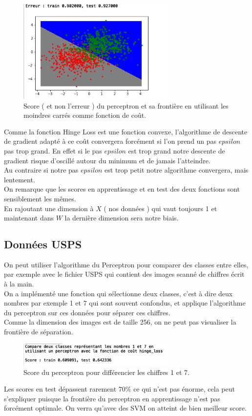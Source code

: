 \documentclass{article}
\begin{document}
\begin{figure}[h]
	\center
	\includegraphics[width=8cm]{figure/tme4_5/borderMse.png} 
	 \caption{Score  ( et non l'erreur )  du perceptron et sa frontière en utilisant les moindres carrés comme fonction de coût. }
	 
\end{figure}
Comme la fonction Hinge Loss est une fonction convexe, l'algorithme de descente de gradient adapté à ce coût convergera forcément si l'on prend un pas $epsilon$ pas trop grand. En effet si le pas $epsilon$ est trop grand notre descente de gradient risque d'oscillé autour du minimum et de jamais l'atteindre.\\ Au contraire si notre pas $epsilon$ est trop petit notre algorithme convergera, mais lentement.\\
On remarque que les scores en apprentissage et en test des deux fonctions sont sensiblement les mêmes.\\En rajoutant une dimension à $X$ ( nos données ) qui vaut toujours 1 et maintenant dans $W$ la dernière dimension sera notre biais.\\
\clearpage
\subsection{Données USPS}
On peut utiliser l'algorithme du Perceptron pour comparer des classes entre elles, par exemple avec le fichier USPS qui contient des images scanné de chiffres écrit à la main.\\ On a implémenté une fonction qui sélectionne deux classes, c'est à dire deux nombres par exemple 1 et 7 qui sont souvent confondus, et applique l'algorithme du perceptron sur ces données pour séparer ces chiffres.\\Comme la dimension des images est de taille 256, on ne peut pas visualiser la frontière de séparation.\\

\begin{figure}[h]
	\center
	\includegraphics[width=8cm]{figure/tme4_5/compareclasse.png} 
	 \caption{Score du perceptron pour différencier les chiffres 1 et 7. }
	 
\end{figure}
Les scores en test dépassent rarement 70\% ce qui n'est pas énorme, cela peut s'expliquer puisque la frontière du perceptron en apprentissage n'est pas forcément optimale. On verra qu'avec des SVM on atteint de bien meilleur score.
\end{document}
